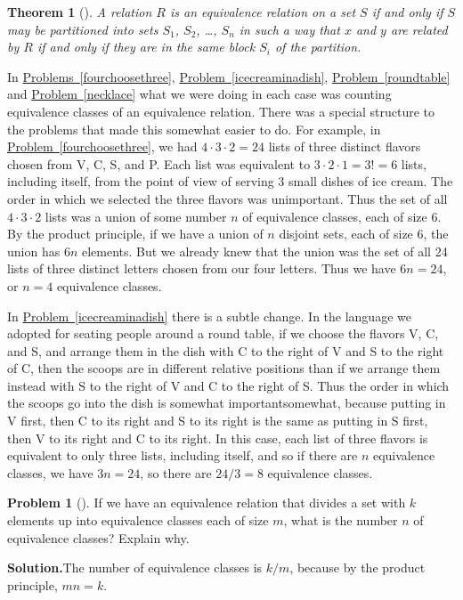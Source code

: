 \documentclass[10pt,]{book}
\theoremstyle{plain}
\newtheorem{theorem}{Theorem}[section]
\theoremstyle{definition}
\newtheorem{activity}[project]{Problem}
\theoremstyle{definition}
\numberwithin{equation}{chapter}
\begin{document}
\begin{theorem}[{}]\label{theorem-11}
A relation \(R\) is an equivalence relation on a set \(S\) if and only if \(S\) may be partitioned into sets \(S_1\), \(S_2\), \dots{}, \(S_n\) in such a way that \(x\) and \(y\) are related by \(R\) if and only if they are in the same block \(S_i\) of the partition. %
\end{theorem}
In \hyperref[fourchoosethree]{Problems~\ref{fourchoosethree}}, \hyperref[icecreaminadish]{Problem~\ref{icecreaminadish}}, \hyperref[roundtable]{Problem~\ref{roundtable}} and \hyperref[necklace]{Problem~\ref{necklace}} what we were doing in each case was counting equivalence classes of an equivalence relation. There was a special structure to the problems that made this somewhat easier to do. For example, in \hyperref[fourchoosethree]{Problem~\ref{fourchoosethree}}, we had \(4\cdot3\cdot2 =24\) lists of three distinct flavors chosen from V, C, S, and P. Each list was equivalent to \(3\cdot2\cdot1=3!=6\) lists, including itself, from the point of view of serving 3 small dishes of ice cream. The order in which we selected the three flavors was unimportant. Thus the set of all \(4\cdot3\cdot2\) lists was a union of some number \(n\) of equivalence classes, each of size 6. By the product principle, if we have a union of \(n\) disjoint sets, each of size 6, the union has \(6n\) elements. But we already knew that the union was the set of all 24 lists of three distinct letters chosen from our four letters. Thus we have \(6n=24\), or \(n=4\) equivalence classes.%
\par
In \hyperref[icecreaminadish]{Problem~\ref{icecreaminadish}} there is a subtle change. In the language we adopted for seating people around a round table, if we choose the flavors V, C, and S, and arrange them in the dish with C to the right of V and S to the right of C, then the scoops are in different relative positions than if we arrange them instead with S to the right of V and C to the right of S. Thus the order in which the scoops go into the dish is somewhat important\textemdash{}somewhat, because putting in V first, then C to its right and S to its right is the same as putting in S first, then V to its right and C to its right. In this case, each list of three flavors is equivalent to only three lists, including itself, and so if there are \(n\) equivalence classes, we have \(3n=24\), so there are \(24/3=8\) equivalence classes.%
\begin{activity}[]\label{EquivPrincipleProblem}
If we have an equivalence relation that divides a set with \(k\) elements up into equivalence classes each of size \(m\), what is the number \(n\) of equivalence classes? Explain why.%
\par\medskip\noindent%
\textbf{Solution.}\quad The number of equivalence classes is \(k/m\), because by the product principle, \(mn=k\).%
\end{activity}
\end{document}
